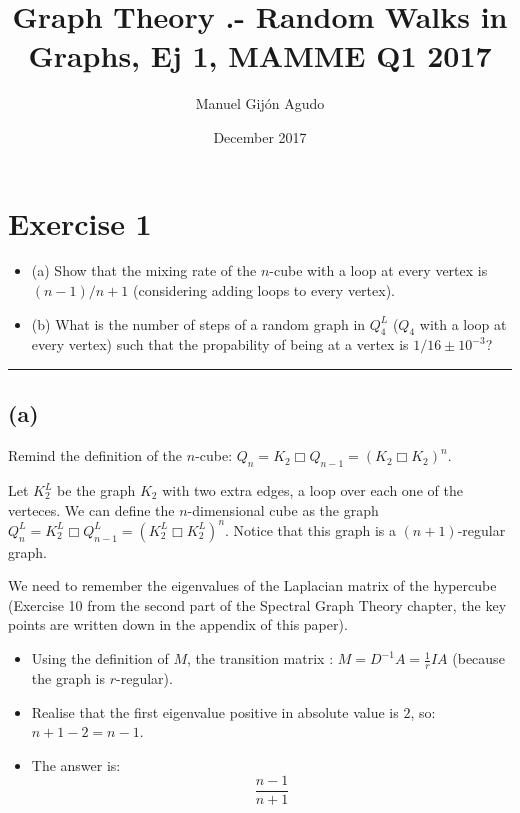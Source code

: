 \documentclass{article}
\title{Graph Theory .- Random Walks in Graphs, Ej 1, MAMME Q1 2017}
\author{Manuel Gijón Agudo}
\date{December 2017}
\begin{document}
\maketitle

\section*{Exercise 1}
\begin{itemize}
    \item (a) Show that the mixing rate of the $n$-cube with a loop at every vertex is $(n-1)/n + 1$ (considering adding loops to every vertex).
    \item (b) What is the number of steps of a random graph in $Q_{4}^{L}$ ($Q_4$ with a loop at every vertex) such that the propability of being at a vertex is $1/16 \pm 10^{-3}$?
\end{itemize}

\noindent
{\color{gray} \rule{\linewidth}{0.5mm} }

\subsection*{(a)}

\noindent Remind the definition of the $n$-cube: $Q_{n} = K_{2} \Box Q_{n-1} = (K_{2} \Box K_{2})^{n}$.


\noindent Let $K_{2}^{L}$ be the graph $K_{2}$ with two extra edges, a loop over each one of the verteces. We can define the $n$-dimensional cube as the graph $Q_{n}^{L} = K_{2}^{L} \Box Q_{n-1}^{L} = (K_{2}^{L} \Box K_{2}^{L})^{n}$. Notice that this graph is a $(n+1)$-regular graph. 


\noindent We need to remember the eigenvalues of the Laplacian matrix of the hypercube (Exercise 10 from the second part of the Spectral Graph Theory chapter, the key points are written down in the appendix of this paper).

\begin{itemize}
    \item Using the definition of $M$, the transition matrix : $M = D^{-1} A = \frac{1}{r} I A$ (because the graph is $r$-regular).
    \item Realise that the first eigenvalue positive in absolute value is $2$, so: $n + 1 - 2 = n - 1$.
    \item The answer is:
    $$
    \boxed{
    \frac{n - 1}{n + 1}
    }
    $$
\end{itemize}
\end{document}
